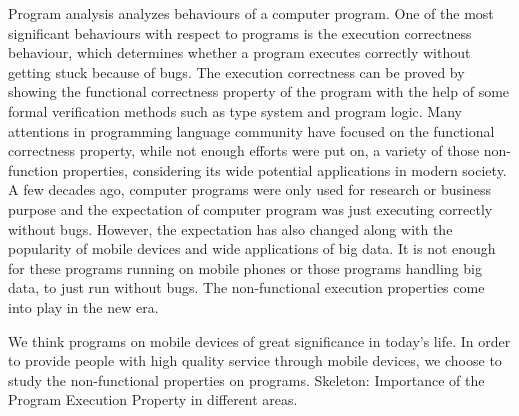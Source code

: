 Program analysis analyzes behaviours of a computer program.
One of the most significant behaviours with respect to programs is the execution correctness behaviour, which determines whether a program executes correctly without getting stuck because of bugs.
 The execution correctness can be proved by showing the functional correctness property of the program with the help of some formal verification methods such as type system and program logic.
 Many attentions in programming language community have focused on the functional correctness property, while not enough efforts were put on, a variety of those non-function properties, considering its wide potential applications in modern society. 
 A few decades ago, computer programs were only used for research or business purpose and the expectation of computer program was just executing correctly without bugs. 
 However, the expectation has also changed along with the popularity of mobile devices and wide applications of big data. 
 It is not enough for these programs running on mobile phones or those programs handling big data, 
 to just run without bugs. 
 The non-functional execution properties come into play in the new era.

 We think programs on mobile devices of great significance in today's life.
 In order to provide people with high quality
 service through mobile devices,
we choose to study the non-functional properties on programs.
 Skeleton:
Importance of the Program Execution Property in different areas.


